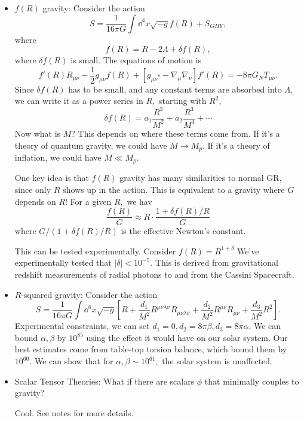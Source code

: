 \documentclass{article}
\numberwithin{equation}{section}
\begin{document}
\begin{itemize}
   \item \textbf{$f(R)$} gravity: Consider the action 
   \begin{equation}
      S = \frac{1}{16\pi G}\int \dd^4{x}\sqrt{-g}f(R) + S_{GHY},
   \end{equation}
   where 
   \begin{equation}
      f(R) = R-2\Lambda + \delta f(R),
   \end{equation}
   where $\delta f(R)$ is small. The equations of motion is 
   \begin{equation}
      f'(R)R_{\mu\nu} - \frac{1}{2}g_{\mu\nu}f(R) + [g_{\mu\nu}\square -\nabla_\mu\nabla_\nu]f'(R) = -8\pi G_N T_{\mu\nu}.
   \end{equation}
   Since $\delta f(R)$ has to be small, and any constant terms are absorbed into $\Lambda,$ we can write it as a power series in $R,$ starting with $R^2,$
   \begin{equation}
      \delta f(R) = a_1 \frac{R^2}{M^2} + a_2 \frac{R^3}{M^4}+\cdots
   \end{equation}
   Now what is $M$? This depends on where these terms come from. If it's a theory of quantum gravity, we could have $M\to M_p.$ If it's a theory of inflation, we could have $M\ll M_p.$

   One key idea is that $f(R)$ gravity has many similarities to normal GR, since only $R$ shows up in the action. This is equivalent to a gravity where $G$ depends on $R$! For a given $R,$ we hav 
   \begin{equation}
      \frac{f(R)}{G}\approx R\cdot \frac{1+\delta f(R)/R}{G}
   \end{equation}
   where $G/(1+\delta f(R)/R)$ is the effective Newton's constant. 
   
   This can be tested experimentally. Consider $f(R)=R^{1+\delta}$ We've experimentally tested that $|\delta|<10^{-5}.$ This is derived from gravitational redshift measurements of radial photons to and from the Cassini Spacecraft.
   \item $R$-squared gravity: Consider the action 
   \begin{equation}
      S = \frac{1}{16\pi G}\int \dd^4{x} \sqrt{-g}\left[R + \frac{d_1}{M^2}R^{\mu\nu \lambda \sigma}R_{\mu\nu\lambda\sigma} + \frac{d_2}{M^2}R^{\mu\nu}R_{\mu\nu}+\frac{d_3}{M^2}R^2\right].
   \end{equation}
   Experimental constraints, we can set $d_1=0,d_2=8\pi \beta,d_3=8\pi \alpha.$ We can bound $\alpha,\beta$ by $10^{85}$ using the effect it would have on our solar system. Our best estimates come from table-top torsion balance, which bound them by $10^{60}.$ We can show that for $\alpha,\beta \sim 10^{61},$ the solar system is unaffected.
   \item Scalar Tensor Theories: What if there are scalars $\phi$ that minimally couples to gravity?
   
   Cool. See notes for more details.
\end{itemize}
\end{document}
